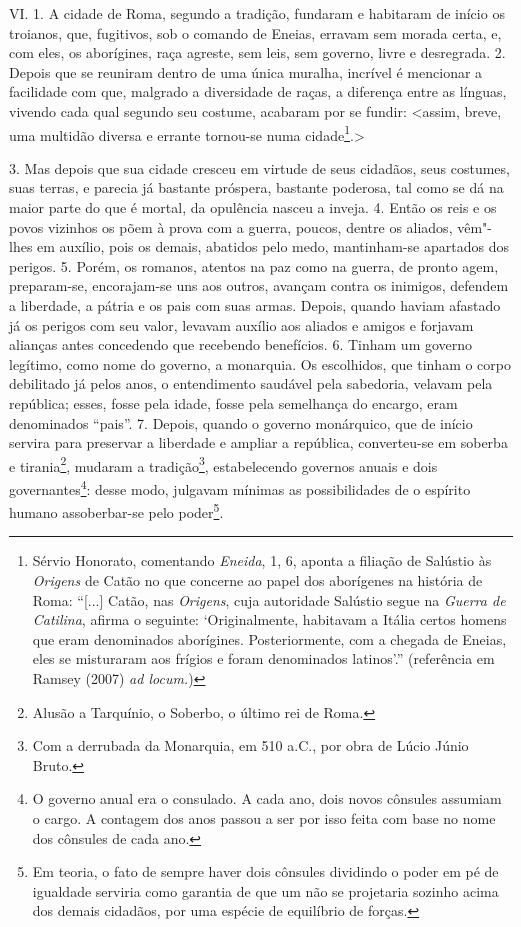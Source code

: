 VI. 1. A cidade de Roma, segundo a tradição, fundaram e habitaram de início os
troianos, que, fugitivos, sob o comando de Eneias, erravam sem morada certa, e,
com eles, os aborígines, raça agreste, sem leis, sem governo, livre e
desregrada. 2. Depois que se reuniram dentro de uma única muralha, incrível é
mencionar a facilidade com que, malgrado a diversidade de raças, a diferença
entre as línguas, vivendo cada qual segundo seu costume, acabaram por se
fundir: \textless assim, breve, uma multidão diversa e errante tornou-se numa
cidade\footnote{Sérvio Honorato, comentando \emph{Eneida}, 1, 6, aponta a
filiação de Salústio às \emph{Origens} de Catão no que concerne ao papel dos
aborígenes na história de Roma: ``[...] Catão, nas \emph{Origens}, cuja
autoridade Salústio segue na \emph{Guerra de Catilina}, afirma o seguinte:
`Originalmente, habitavam a Itália certos homens que eram denominados
aborígines. Posteriormente, com a chegada de Eneias, eles se misturaram aos
frígios e foram denominados latinos'.'' (referência em Ramsey (2007) \emph{ad
locum.})}.\textgreater

3. Mas depois que sua cidade cresceu em virtude de seus cidadãos, seus
costumes, suas terras, e parecia já bastante próspera, bastante poderosa, tal
como se dá na maior parte do que é mortal, da opulência nasceu a inveja. 4.
Então os reis e os povos vizinhos os põem à prova com a guerra, poucos, dentre
os aliados, vêm"-lhes em auxílio, pois os demais, abatidos pelo medo,
mantinham-se apartados dos perigos. 5. Porém, os romanos, atentos na paz como
na guerra, de pronto agem, preparam-se, encorajam-se uns aos outros, 
avançam contra %
os inimigos, defendem a liberdade, a pátria e os pais com suas armas.
Depois, quando haviam afastado já os perigos com seu valor, levavam auxílio aos
aliados e amigos e forjavam alianças antes concedendo que recebendo benefícios.
6. Tinham um governo legítimo, como nome do governo, a monarquia. Os
escolhidos, que tinham o corpo debilitado já pelos anos, o entendimento
saudável pela sabedoria, velavam pela república; esses, fosse pela idade, fosse
pela semelhança do encargo, eram denominados “pais”. 7. Depois, quando o
governo monárquico, que de início servira para preservar a liberdade e ampliar
a república, converteu-se em soberba e tirania\footnote{Alusão a Tarquínio, o
Soberbo, o último rei de Roma.}, mudaram a tradição\footnote{Com a derrubada da
Monarquia, em 510 a.C., por obra de Lúcio Júnio  Bruto.}, estabelecendo
governos anuais e dois governantes\footnote{O governo anual era o consulado. A
cada ano, dois novos cônsules assumiam o cargo. A contagem dos anos passou a
ser por isso feita com base no nome dos cônsules de cada ano.}: desse modo,
julgavam mínimas as possibilidades de o espírito humano assoberbar-se pelo
poder\footnote{Em teoria, o fato de sempre haver dois cônsules dividindo  o
poder em pé de igualdade serviria como garantia de que um não se projetaria
sozinho acima dos demais cidadãos, por uma espécie de equilíbrio de forças.}.

